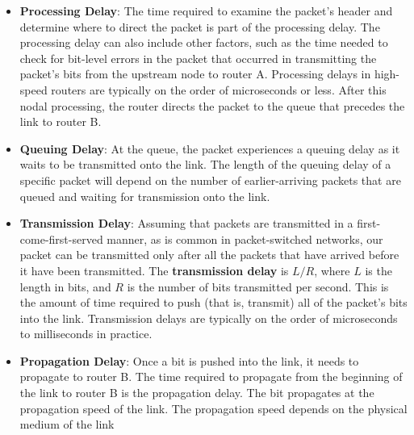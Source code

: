 \documentclass{report}
\begin{document}
\begin{itemize}
            \bigbreak \noindent 
            As part of its end-to-end route between source and destination, a packet is sent from the upstream node through router A to router B. Our goal is to characterize the nodal delay at router A. Note that router A has an outbound link leading to router B. This link is preceded by a queue (also known as a buffer). When the packet arrives at router A from the upstream node, router A examines the packet’s header to determine the appropriate outbound link for the packet and then directs the packet to this link. In this example, the outbound link for the packet is the one that leads to router B. A packet can be transmitted on a link only if there is no other packet currently being transmitted on the link and if there are no other packets preceding it in the queue; if the link is currently busy or if there are other packets already queued for the link, the newly arriving packet will then join the queue.
        \item \textbf{Processing Delay}: The time required to examine the packet’s header and determine where to direct the packet is part of the processing delay. The processing delay can also include other factors, such as the time needed to check for bit-level errors in the packet that occurred in transmitting the packet’s bits from the upstream node to router A. Processing delays in high-speed routers are typically on the order of microseconds or less. After this nodal processing, the router directs the packet to the queue that precedes the link to router B.
        \item \textbf{Queuing Delay}: At the queue, the packet experiences a queuing delay as it waits to be transmitted onto the link. The length of the queuing delay of a specific packet will depend on the number of earlier-arriving packets that are queued and waiting for transmission onto the link.
        \item \textbf{Transmission Delay}: Assuming that packets are transmitted in a first-come-first-served manner, as is common in packet-switched networks, our packet can be transmitted only after all the packets that have arrived before it have been transmitted.
            \bigbreak \noindent 
            The \textbf{transmission delay} is $L / R$, where $L$ is the length in bits, and $R$ is the number of bits transmitted per second. This is the amount of time required to push (that is, transmit) all of the packet’s bits into the link. Transmission delays are typically on the order of microseconds to milliseconds in practice.
        \item \textbf{Propagation Delay}: Once a bit is pushed into the link, it needs to propagate to router B. The time required to propagate from the beginning of the link to router B is the propagation delay. The bit propagates at the propagation speed of the link. The propagation speed depends on the physical medium of the link

\end{itemize}
\end{document}
